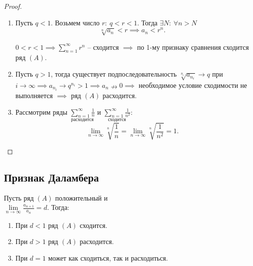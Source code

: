 \begin{proof}\leavevmode
    \begin{enumerate}
        \item Пусть $q < 1$. Возьмем число $r: \ q < r < 1$. Тогда $\exists N: \ \forall n > N$
              \[
                  \sqrt[n]{a_n} < r \implies a_n < r^n.
              \]

              $0 < r < 1 \implies \sum_{n=1}^{\infty}r^n$ -- сходится $\implies$ по 1-му признаку сравнения сходится ряд $(A)$.

        \item Пусть $q > 1$, тогда существует подпоследовательность $\sqrt[n_i]{a_{n_i}} \rightarrow q$ при $i\rightarrow\infty \implies a_{n_i}\rightarrow q^{n_i} > 1 \implies a_n \nrightarrow  0 \implies $ необходимое условие сходимости не выполняется $ \implies $ ряд $(A)$ расходится.

        \item Рассмотрим ряды $\underset{\text{расходится}}{\sum_{n=1}^{\infty}\frac{1}{n}}$ и $\underset{\text{сходится}}{\sum_{n=1}^{\infty}\frac{1}{n^2}}$:
              \[
                  \underset{n\rightarrow\infty}{\lim}\sqrt[n]{\frac{1}{n}} = \underset{n\rightarrow\infty}{\lim}\sqrt[n]{\frac{1}{n^2}} = 1.
              \]
    \end{enumerate}
\end{proof}

\subsection{Признак Даламбера}

\begin{theorem}
    Пусть ряд $(A)$ положительный и  \\ $ \underset{n\rightarrow\infty}{\lim}\frac{a_{n+1}}{a_n} = d $. Тогда:
    \begin{enumerate}
        \item При $d < 1$ ряд $(A)$ сходится.
        \item При $d > 1$ ряд $(A)$ расходится.
        \item При $d = 1$ может как сходиться, так и расходиться.
    \end{enumerate}
\end{theorem}

